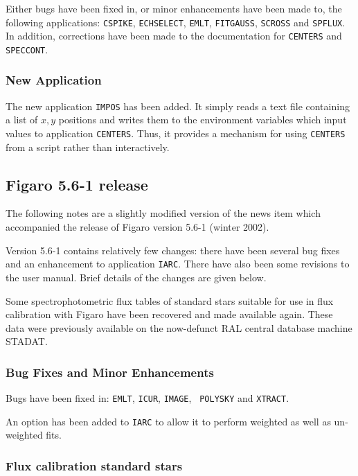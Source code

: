 \documentclass[11pt,twoside]{article}
\begin{document}
 Either bugs have been fixed in, or minor enhancements have been made to,
 the following applications: {\tt CSPIKE}, {\tt ECHSELECT}, {\tt EMLT},
 {\tt FITGAUSS}, {\tt SCROSS} and {\tt SPFLUX}.  In addition, corrections
 have been made to the documentation for {\tt CENTERS} and {\tt SPECCONT}.

\subsubsection{New Application}

 The new application {\tt IMPOS} has been added.  It simply reads a text
 file containing a list of $x,y$\/ positions and writes them to the
 environment variables which input values to application {\tt CENTERS}.
 Thus, it provides a mechanism for using {\tt CENTERS} from a script rather
 than interactively.

\subsection{\label{news561}Figaro 5.6-1 release}

 The following notes are a slightly modified version of the news item
 which accompanied the release of Figaro version 5.6-1 (winter 2002).

 Version 5.6-1 contains relatively few changes: there have been several
 bug fixes and an enhancement to application {\tt IARC}.  There have also
 been some revisions to the user manual.  Brief details of the changes are
 given below.

 Some spectrophotometric flux tables of standard stars suitable for use
 in flux calibration with Figaro have been recovered and made available
 again.  These data were previously available on the now-defunct RAL
 central database machine STADAT.

\subsubsection{Bug Fixes and Minor Enhancements}

 Bugs have been fixed in: {\tt EMLT}, {\tt ICUR}, {\tt IMAGE}, {\tt
 POLYSKY} and {\tt XTRACT}.

 An option has been added to {\tt IARC} to allow it to perform weighted as
 well as un-weighted fits.

\subsubsection{Flux calibration standard stars}
\end{document}
